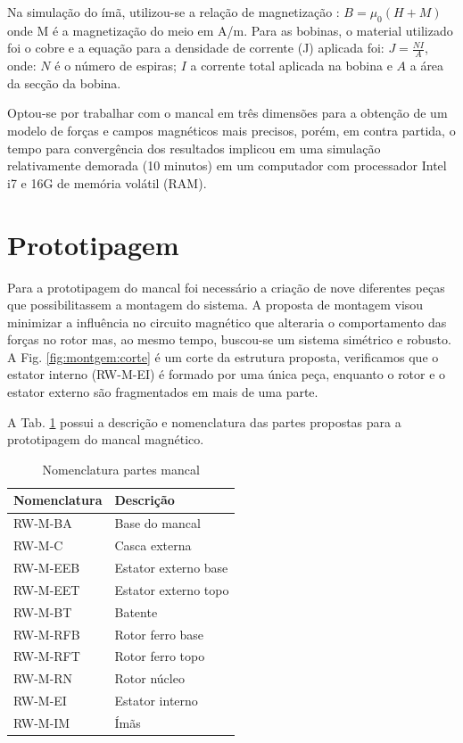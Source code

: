 Na simulação do ímã, utilizou-se a relação de magnetização : $B = \mu_0 (H + M)$ onde M é a magnetização do meio em A/m. Para as bobinas, o material utilizado foi o cobre e a equação para a densidade de corrente (J) aplicada foi: $ J = \frac{N I}{A}$, onde: $N$ é o número de espiras; $I$ a corrente total aplicada na bobina e $A$ a área da secção da bobina.

Optou-se por trabalhar com o mancal em três dimensões para a obtenção de um modelo de forças e campos magnéticos mais precisos, porém, em contra partida, o tempo para convergência dos resultados implicou em uma simulação relativamente demorada (10 minutos) em um computador com processador Intel i7 e 16G de memória volátil (RAM).

\section{Prototipagem}
 
Para a prototipagem do mancal foi necessário a criação de nove diferentes peças que possibilitassem a montagem do sistema. A proposta de montagem visou minimizar a influência no circuito magnético que alteraria o comportamento das forças no rotor mas, ao mesmo tempo, buscou-se um sistema simétrico e robusto.  A Fig. \ref{fig:montgem:corte} é um corte da estrutura proposta, verificamos que o estator interno (RW-M-EI) é formado por uma única peça, enquanto o rotor e o estator externo são fragmentados em mais de uma parte.

A Tab. \ref{Tab:nomenclatura:mancal} possui a descrição e nomenclatura das partes propostas para a prototipagem do mancal magnético.

 \begin{table}[ht!]
 	\centering
 	\begin{tabular}{l l}
 		Nomenclatura & Descrição  \\ \hline
 		RW-M-BA 		&	Base do mancal \\
 		RW-M-C   		 &	Casca externa\\
 		RW-M-EEB	  & Estator externo base\\
 		RW-M-EET & 	Estator externo topo\\
 		RW-M-BT & 	Batente\\
 		RW-M-RFB & 	Rotor ferro base\\
 		RW-M-RFT	&  Rotor ferro topo\\
 		RW-M-RN & 	Rotor núcleo\\
 		RW-M-EI	&  Estator interno\\
		RW-M-IM	&  Ímãs 
 	\end{tabular} 
 	\caption{Nomenclatura partes mancal}
 	\label{Tab:nomenclatura:mancal} 
 \end{table} 


